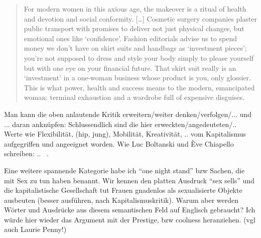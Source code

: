 \begin{quote}
For modern women in this axious age, the makeover is a ritual of health and devotion and social conformity.
[\ldots]
Cosmetic surgery companies plaster public transport with promises to deliver not just physical changes, but emotional ones like `confidence'.
Fashion editorials advise us to spend money we don't have on skirt suits and handbags as `investment pieces'; you're not supposed to dress and style your body simply to please yourself but with one eye on your financial future.
That skirt suit really is an `investment' in a one-woman business whose product is you, only glossier.
This is what power, health and success means to the modern, emancipated woman: terminal exhaustion and a wardrobe full of expensive disguises.~\cite[p.41-42]{Penny14}
\end{quote}



Man kann die oben anlautende Kritik erweitern/weiter denken/verfolgen/... und ... daran anknüpfen:
Schlussendlich sind die hier erweckten/angedeuteten/.. Werte wie Flexibilität, (hip, jung), Mobilität, Kreativität, .. vom Kapitalismus aufgegriffen und angeeignet worden.
Wie Luc Boltanski und Ève Chiapello schreiben: .. ~\cite[]{BolChi07}.

Eine weitere spannende Kategorie habe ich ``one night stand'' bzw Sachen, die mit Sex zu tun haben benannt.
Wir kennen den platten Ausdruck ``sex sells'' und die kapitalistische Gesellschaft tut Frauen gnadenlos als sexualisierte Objekte ausbeuten (besser ausführen, nach Kapitalismuskritik).
Warum aber werden Wörter und Ausdrücke aus diesem semantischen Feld auf Englisch gebraucht?
Ich würde hier wieder das Argument mit der Prestige, bzw coolness heranziehen. (vgl auch Laurie Penny!)




\begin{comment}
Eckert:

``Once the agent isolates and attributes significance to a feature, that feautre becomes a resource that he or she can incorporate or not into his or her own style.''
--> Switching is identified as a resource by the publishers of the magazine

1st order indexicality/Indizes
Latinas

2nd order
bewusste Nutzung von bilingualen Codes von den Herausgeberinnen um sich als Latinas zu positionieren und diese anzusprechen; eine Sisterhood zu simulieren

3rd order
social mobility/prestige?
\end{comment}


